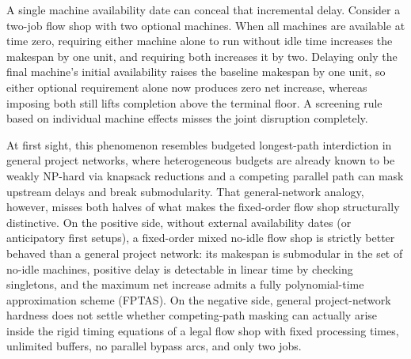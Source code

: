 \documentclass[11pt,letterpaper]{article}
\begin{document}
A single machine availability date can conceal that incremental delay. Consider a two-job flow shop with two optional machines. When all machines are available at time zero, requiring either machine alone to run without idle time increases the makespan by one unit, and requiring both increases it by two. Delaying only the final machine's initial availability raises the baseline makespan by one unit, so either optional requirement alone now produces zero net increase, whereas imposing both still lifts completion above the terminal floor. A screening rule based on individual machine effects misses the joint disruption completely.

At first sight, this phenomenon resembles budgeted longest-path interdiction in general project networks, where heterogeneous budgets are already known to be weakly NP-hard via knapsack reductions and a competing parallel path can mask upstream delays and break submodularity. That general-network analogy, however, misses both halves of what makes the fixed-order flow shop structurally distinctive. On the positive side, without external availability dates (or anticipatory first setups), a fixed-order mixed no-idle flow shop is strictly better behaved than a general project network: its makespan is submodular in the set of no-idle machines, positive delay is detectable in linear time by checking singletons, and the maximum net increase admits a fully polynomial-time approximation scheme (FPTAS). On the negative side, general project-network hardness does not settle whether competing-path masking can actually arise inside the rigid timing equations of a legal flow shop with fixed processing times, unlimited buffers, no parallel bypass arcs, and only two jobs.
\end{document}
